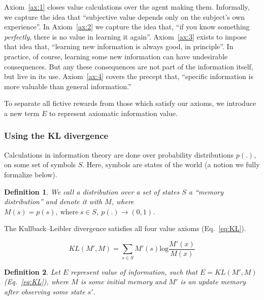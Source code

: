 \documentclass[9pt,twocolumn,twoside]{pnas-new}
\newtheorem{definition}{Definition}
\begin{document}
Axiom~\ref{ax:1} closes value calculations over the agent making them. Informally, we capture the idea that ``subjective value depends only on the subject's own experience''.  In Axiom~\ref{ax:2} we capture the idea that, ``if you know something \textit{perfectly}, there is no value in learning it again''. Axiom~\ref{ax:3} exists to impose that idea that, ``learning new information is always good, in principle''. In practice, of course, learning some new information can have undesirable consequences. But any these consequences are not part of the information itself, but live in its use. Axiom~\ref{ax:4} covers the precept that, ``specific information is more valuable than general information.'' 

To separate all fictive rewards from those which satisfy our axioms, we introduce a new term $E$ to represent axiomatic information value.

\subsubsection*{Using the KL divergence}

Calculations in information theory are done over probability distributions $p(.)$, on some set of symbols $S$. Here, symbols are states of the world (a notion we fully formalize below). 

\begin{definition}
    We call a distribution over a set of states $S$ a ``memory distribution'' and denote it with $M$, where $M(s) = p(s), \ \text{where} \ s \in S, \ p(.) \rightarrow (0, 1)$.
\end{definition}

The Kullback--Leibler divergence satisfies all four value axioms (Eq.~\ref{eq:KL}). 

\begin{equation}
    KL(M', M) = \sum_{s \in S} M'(s) \text{log} \frac{M'(x)}{M(x)} 
    \label{eq:KL}
\end{equation}

\begin{definition}
    Let $E$ represent value of information, such that $E = KL(M', M)$ (Eq.~\ref{eq:KL}), where $M$ is some initial memory and $M'$ is an update memory after observing some state $s'$.
\end{definition}
\end{document}
